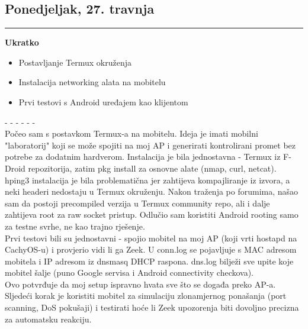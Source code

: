 \documentclass[12pt, a4paper]{article}
\newcommand{\dan}[1]{
    \subsection*{#1}
    \vspace{-0.5em} 
    \hrule \vspace{0.5em} 
}
\begin{document}
\dan{Ponedjeljak, 27. travnja}
\textbf{Ukratko}
\begin{itemize}
    \item Postavljanje Termux okruženja
    \item Instalacija networking alata na mobitelu
    \item Prvi testovi s Android uređajem kao klijentom
\end{itemize}
- - - - - - \\
Počeo sam s postavkom Termux-a na mobitelu. Ideja je imati mobilni "laboratorij" koji se može spojiti na moj AP i generirati kontrolirani promet bez potrebe za dodatnim hardverom. Instalacija je bila jednostavna - Termux iz F-Droid repozitorija, zatim pkg install za osnovne alate (nmap, curl, netcat).
\\
hping3 instalacija je bila problematična jer zahtijeva kompajliranje iz izvora, a neki headeri nedostaju u Termux okruženju. Nakon traženja po forumima, našao sam da postoji precompiled verzija u Termux community repo, ali i dalje zahtijeva root za raw socket pristup. Odlučio sam koristiti Android rooting samo za testne svrhe, ne kao trajno rješenje.
\\
Prvi testovi bili su jednostavni - spojio mobitel na moj AP (koji vrti hostapd na CachyOS-u) i provjerio vidi li ga Zeek. U conn.log se pojavljuje s MAC adresom mobitela i IP adresom iz dnsmasq DHCP raspona. dns.log bilježi sve upite koje mobitel šalje (puno Google servisa i Android connectivity checkova).
\\
Ovo potvrđuje da moj setup ispravno hvata sve što se događa preko AP-a. Sljedeći korak je koristiti mobitel za simulaciju zlonamjernog ponašanja (port scanning, DoS pokušaji) i testirati hoće li Zeek upozorenja biti dovoljno precizna za automatsku reakciju.
\end{document}
